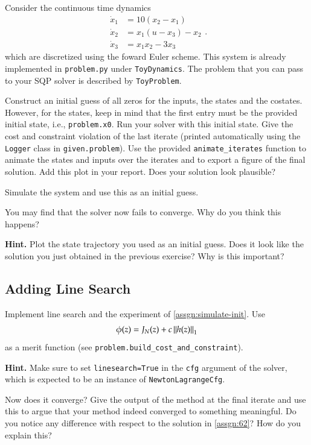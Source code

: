 \documentclass[]{article}
\begin{document}
Consider the continuous time dynamics 
\[
\begin{aligned}
  \dot{x}_1 &=  10(x_2 - x_1) \\
  \dot{x}_2 &= x_1(u - x_3) - x_2 \\
  \dot{x}_3 &= x_1x_2 - 3x_3 
\end{aligned}
.\] 
which are discretized using the foward Euler scheme. 
This system is already implemented in \texttt{problem.py} under \texttt{ToyDynamics}. 
The problem that you can pass to your SQP solver is described by \texttt{ToyProblem}.

\begin{assignment} \label{assgn:62}
	Construct an initial guess of all zeros for the inputs, the states and the costates.
	However, for the states, keep in mind that the first entry must be the provided initial 
	state, i.e., \texttt{problem.x0}. Run your solver with this 
	initial state. Give the cost and constraint violation of the last iterate
	(printed automatically using the \texttt{Logger} class in \texttt{given.problem}). 
	Use the provided \texttt{animate\_iterates} function to animate the states and inputs over the iterates and to export a 
	figure of the final solution. Add this plot in your report. Does your solution look plausible?
\end{assignment}


\begin{assignment} \label{assgn:simulate-init}
   Simulate the system and use this as an initial guess.

   You may find that the solver now fails to converge. 
   Why do you think this happens? 
   
   \textbf{Hint.} Plot the state trajectory you used as an initial guess. 
   Does it look like the solution you just obtained in the previous exercise? 
   Why is this important?
\end{assignment}



\subsection{Adding Line Search}

\begin{assignment}
   Implement line search and the experiment of \cref{assgn:simulate-init}. 
   Use 
	\[ 
		\phi(z) = J_N(z) + c \left\|h(z)\right\|_1 
	\]
	as a merit function (see \texttt{problem.build\_cost\_and\_constraint}). 

	\textbf{Hint.} Make sure to set \texttt{linesearch=True} in the \texttt{cfg} argument of the solver, 
	which is expected to be an instance of \texttt{NewtonLagrangeCfg}.
	
   Now does it converge? Give the output of the method at the final iterate and use this 
   to argue that your method indeed converged to something meaningful. 
   Do you notice any difference with respect to the solution in \cref{assgn:62}? 
   How do you explain this?
\end{assignment}
\end{document}
